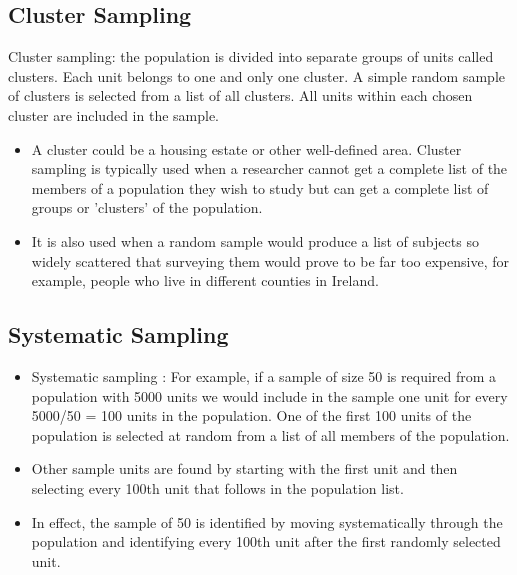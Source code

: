 ﻿\documentclass[]{report}
\begin{document}
\subsection*{Cluster Sampling}
Cluster sampling: the population is divided into separate groups of units called clusters. Each unit belongs to one and only one cluster. A simple random sample of clusters is selected from a list of all clusters. All units within each chosen cluster are included in the sample. 


\begin{itemize}
\item A cluster could be a housing estate or other well-defined area. Cluster sampling is typically used when a researcher cannot get a complete list of the members of a population they wish to study but can get a complete list of groups or 'clusters' of the population. 
\item It is also used when a random sample would produce a list of subjects so widely scattered that surveying them would prove to be far too expensive, for example, people who live in different counties in Ireland. 
\end{itemize}

\subsection*{Systematic Sampling}
\begin{itemize}
\item Systematic sampling : For example, if a sample of size 50 is required from a population with 5000 units we would include in the sample one unit for every 5000/50 = 100 units in the population. One of the first 100 units of the population is selected at random from a list of all members of the population. 

\item Other sample units are found by starting with the first unit and then selecting every 100th unit that follows in the population list. 

\item In effect, the sample of 50 is identified by moving systematically through the population and identifying every 100th unit after the first randomly selected unit.
\end{itemize}
\end{document}
